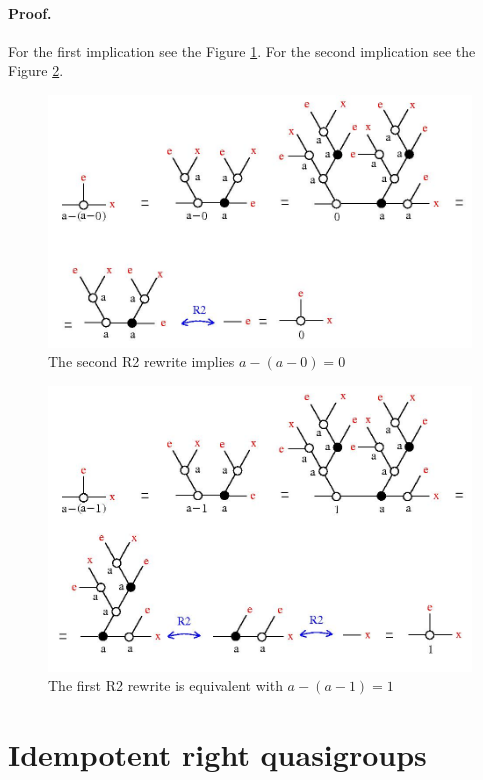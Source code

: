 \documentclass{article}
\begin{document}
\paragraph{Proof.} For the first implication see the Figure \ref{a-a-0r2-fig}. For the second implication see the Figure \ref{a-a-1r2-fig}. 
\begin{figure}[h]\centerline{\includegraphics[width=120mm]{jpg/a-a-0r2.jpg}}  \caption{ The second R2 rewrite implies $a-(a-0) = 0$ } \label{a-a-0r2-fig} \end{figure}

\begin{figure}[h]\centerline{\includegraphics[width=120mm]{jpg/a-a-1r2.jpg}}  \caption{ The first R2 rewrite is equivalent with $a-(a-1) = 1$ } \label{a-a-1r2-fig} \end{figure}

\vspace{.5cm}


\section{Idempotent right quasigroups}
\end{document}
